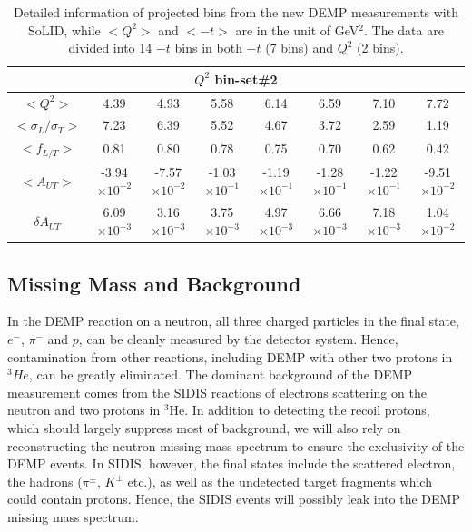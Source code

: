 \begin{table}[!ht]
\begin{tabular}{|c|c|c|c|c|c|c|c|}
\hline
\multicolumn{8}{|c|}{$Q^{2}$ bin-set\#2 } \\
\hline 
$<Q^{2}>$   &  4.39 &  4.93 & 5.58 & 6.14 & 6.59 & 7.10 & 7.72 \\
$<\sigma_{L}/\sigma_{T}>$   &  7.23 &  6.39 & 5.52 & 4.67 & 3.72 & 2.59 & 1.19 \\
$<f_{L/T}>$     &  0.81 &  0.80 & 0.78 & 0.75 & 0.70 & 0.62 & 0.42 \\
$<A_{UT}>$   &  -3.94$\times 10^{-2}$ &  -7.57$\times 10^{-2}$ & -1.03$\times 10^{-1}$ & -1.19$\times 10^{-1}$ & -1.28$\times 10^{-1}$ & -1.22$\times 10^{-1}$ & -9.51$\times 10^{-2}$ \\
$\delta A_{UT}$   &  6.09$\times 10^{-3}$ &  3.16$\times 10^{-3}$ & 3.75$\times 10^{-3}$ & 4.97$\times 10^{-3}$ & 6.66$\times 10^{-3}$ & 7.18$\times 10^{-3}$ & 1.04$\times 10^{-2}$ \\
\hline
\end{tabular}
\caption[Detailed information of projected bins]{\footnotesize{Detailed
information of projected bins from the new DEMP measurements with SoLID, while
$<Q^{2}>$ and $<-t>$ are in the unit of GeV$^{2}$. The data are
divided into 14 $-t$ bins in both $-t$ (7 bins) and $Q^{2}$ (2 bins).}}
\label{asym_bin_table}
\end{table} 

\subsection{Missing Mass and Background}

In the DEMP reaction on a neutron, all three charged particles in the final state, $e^{-}$, $\pi^{-}$ and $p$,
can be cleanly measured by the detector system.  Hence, contamination from other reactions, including
DEMP with other two protons in $^{3}He$, can be greatly eliminated.  The
dominant background of the DEMP measurement comes from the SIDIS reactions of
electrons scattering on the neutron and two protons in $\mathrm{^{3}He}$. In
addition to detecting the recoil protons, which should largely suppress most of
background, we will also rely on reconstructing the neutron missing mass
spectrum to ensure the exclusivity of the DEMP events. In SIDIS, however, the
final states include the scattered electron, the hadrons ($\pi^{\pm}$,
$K^{\pm}$ etc.), as well as the undetected target fragments which could contain
protons. Hence, the SIDIS events will possibly leak into the DEMP missing mass
spectrum.

